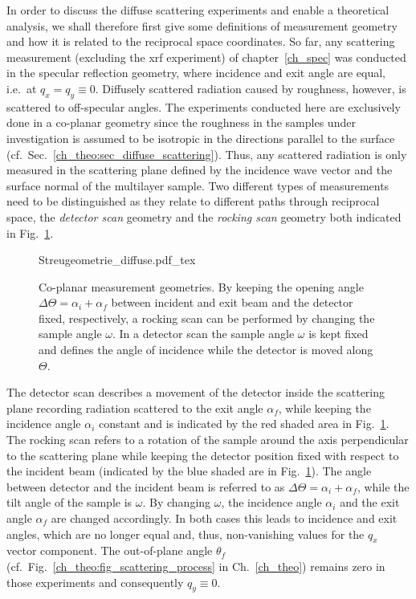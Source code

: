 In order to discuss the diffuse scattering experiments and enable a theoretical analysis, we shall therefore first give some definitions of measurement geometry and how it is related to the reciprocal space coordinates. So far, any scattering measurement (excluding the \gls{xrf} experiment) of chapter~\ref{ch_spec} was conducted in the specular reflection geometry, where incidence and exit angle are equal, i.e.~at $q_x = q_y \equiv 0$. Diffusely scattered radiation caused by roughness, however, is scattered to off-specular angles. The experiments conducted here are exclusively done in a co-planar geometry since the roughness in the samples under investigation is assumed to be isotropic in the directions parallel to the surface (cf.~Sec.~\ref{ch_theo:sec_diffuse_scattering}). Thus, any scattered radiation is only measured in the scattering plane defined by the incidence wave vector and the surface normal of the multilayer sample. Two different types of measurements need to be distinguished as they relate to different paths through reciprocal space, the \emph{detector scan} geometry and the \emph{rocking scan} geometry both indicated in Fig.~\ref{ch_diff:fig_scattering_geometry}.
\begin{figure}[htbp]
    \def\svgwidth{0.6\textwidth}
    {Streugeometrie_diffuse.pdf_tex}
    \caption[Co-planar measurement geometries for the diffuse scattering.]{Co-planar measurement geometries. By keeping the opening angle $\Delta\Theta = \alpha_i + \alpha_f$ between incident and exit beam and the detector fixed, respectively, a rocking scan can be performed by changing the sample angle $\omega$. In a detector scan the sample angle $\omega$ is kept fixed and defines the angle of incidence while the detector is moved along $\Theta$.}
    \label{ch_diff:fig_scattering_geometry}
\end{figure}
The detector scan describes a movement of the detector inside the scattering plane recording radiation scattered to the exit angle $\alpha_f$, while keeping the incidence angle $\alpha_i$ constant and is indicated by the red shaded area in Fig.~\ref{ch_diff:fig_scattering_geometry}. The rocking scan refers to a rotation of the sample around the axis perpendicular to the scattering plane while keeping the detector position fixed with respect to the incident beam (indicated by the blue shaded are in Fig.~\ref{ch_diff:fig_scattering_geometry}). The angle between detector and the incident beam is referred to as $\Delta \Theta = \alpha_i + \alpha_f$, while the tilt angle of the sample is $\omega$. By changing $\omega$, the incidence angle $\alpha_i$ and the exit angle $\alpha_f$ are changed accordingly. In both cases this leads to incidence and exit angles, which are no longer equal and, thus, non-vanishing values for the $q_x$ vector component. The out-of-plane angle $\theta_f$ (cf.~Fig.~\ref{ch_theo:fig_scattering_process} in Ch.~\ref{ch_theo}) remains zero in those experiments and consequently $q_y \equiv 0$.

